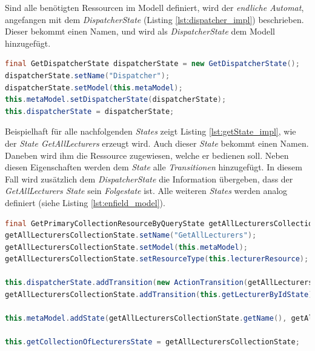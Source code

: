 Sind alle benötigten Ressourcen im Modell definiert, wird der \textit{endliche Automat}, angefangen mit dem \textit{DispatcherState} (Listing \ref{lst:dispatcher_impl}) beschrieben. Dieser bekommt einen Namen, und wird als \textit{DispatcherState} dem Modell hinzugefügt.

\begin{lstlisting}[label=lst:dispatcher_impl,
language=java,
firstnumber=1,
caption=Erzeugung des \textit{DispatcherStates}. ]
final GetDispatcherState dispatcherState = new GetDispatcherState();
dispatcherState.setName("Dispatcher");
dispatcherState.setModel(this.metaModel);
this.metaModel.setDispatcherState(dispatcherState);
this.dispatcherState = dispatcherState;
\end{lstlisting}

\newpage

Beispielhaft für alle nachfolgenden \textit{States} zeigt Listing \ref{lst:getState_impl}, wie der \textit{State GetAllLecturers} erzeugt wird.
Auch dieser \textit{State} bekommt einen Namen. Daneben wird ihm die Ressource zugewiesen, welche er bedienen soll. Neben diesen Eigenschaften werden dem \textit{State} alle \textit{Transitionen} hinzugefügt. In diesem Fall wird zusätzlich dem \textit{DispatcherState} die Information übergeben, dass der \textit{GetAllLecturers State} sein \textit{Folgestate} ist. Alle weiteren \textit{States} werden analog definiert (siehe Listing \ref{lst:enfield_model}).

\begin{lstlisting}[label=lst:getState_impl,
language=java,
firstnumber=1,
caption=Erzeugung des \textit{GetAllLecturers States}. ]
final GetPrimaryCollectionResourceByQueryState getAllLecturersCollectionState = new GetPrimaryCollectionResourceByQueryState();
getAllLecturersCollectionState.setName("GetAllLecturers");
getAllLecturersCollectionState.setModel(this.metaModel);
getAllLecturersCollectionState.setResourceType(this.lecturerResource);

this.dispatcherState.addTransition(new ActionTransition(getAllLecturersCollectionState, "getAllLecturers"));
getAllLecturersCollectionState.addTransition(this.getLecturerByIdState);

this.metaModel.addState(getAllLecturersCollectionState.getName(), getAllLecturersCollectionState);

this.getCollectionOfLecturersState = getAllLecturersCollectionState;
\end{lstlisting}
 
 \newpage
 
